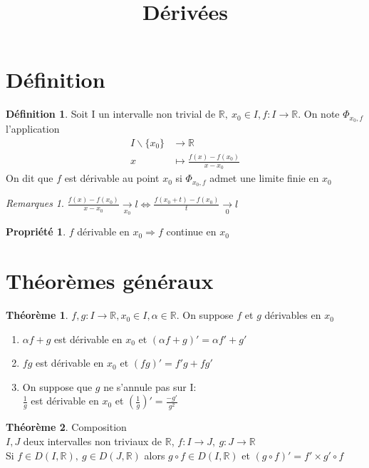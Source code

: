 \documentclass[fleqn]{article}
\title{D\'eriv\'ees}
\date{}
\theoremstyle{definition} \newtheorem*{defi}{D\'efinition}
\theoremstyle{definition} \newtheorem*{theo}{Th\'eor\`eme}
\theoremstyle{remark} \newtheorem*{rqs}{Remarques}
\theoremstyle{definition} \newtheorem*{prop}{Propri\'et\'e}
\begin{document}
\maketitle

\section{D\'efinition}
\begin{defi}
	Soit I un intervalle non trivial de $\mathbb{R},\ x_0 \in I, f:I \rightarrow \mathbb{R}$. On note $\Phi_{x_0, f}$ l'application
	\begin{align*}
		I\backslash\{x_0\} &\rightarrow \mathbb{R} \\
		x &\mapsto \frac{f(x) - f(x_0)}{x - x_0}
	\end{align*}
	On dit que $f$ est d\'erivable au point $x_0$ si $\Phi_{x_0, f}$ admet une limite finie en $x_0$
\end{defi}

\begin{rqs}
	$\frac{f(x) - f(x_0)}{x - x_0} \underset{x_0}{\rightarrow} l \Leftrightarrow \frac{f(x_0 + t) - f(x_0)}{t} \underset{0}{\rightarrow} l$
\end{rqs}

\begin{prop}
	$f$ d\'erivable en $x_0 \Rightarrow f$ continue en $x_0$
\end{prop}

\section{Th\'eor\`emes g\'en\'eraux}
\begin{theo}
	$f,g: I \rightarrow \mathbb{R}, x_0 \in I, \alpha \in \mathbb{R}$. On suppose $f$ et $g$ d\'erivables en $x_0$
	\begin{enumerate}
		\item $\alpha f + g$ est d\'erivable en $x_0$ et $(\alpha f + g)' = \alpha f' + g'$
		\item $fg$ est d\'erivable en $x_0$ et $(fg)' = f'g + fg'$
		\item On suppose que $g$ ne s'annule pas sur I:\\
			$\frac{1}{g}$ est d\'erivable en $x_0$ et $(\frac{1}{g})' = \frac{-g'}{g^2}$
	\end{enumerate}
\end{theo}

\begin{theo} Composition\\
	$I,J$ deux intervalles non triviaux de $\mathbb{R}$, $f:I\rightarrow J,\ g:J \rightarrow \mathbb{R}$ \\
	Si $f \in D(I, \mathbb{R}),\ g \in D(J, \mathbb{R})$ alors $g\circ f \in D(I, \mathbb{R})$ et $(g\circ f)' = f' \times g'\circ f$
\end{theo}
\end{document}

